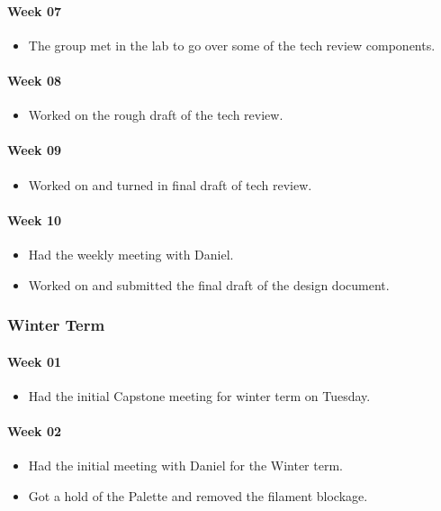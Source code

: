 \paragraph{Week 07}
\begin{itemize}
\item The group met in the lab to go over some of the tech review components. 
\end{itemize}
\paragraph{Week 08}
\begin{itemize}
\item Worked on the rough draft of the tech review. 
\end{itemize}
\paragraph{Week 09}
\begin{itemize}
\item Worked on and turned in final draft of tech review. 
\end{itemize}
\paragraph{Week 10}
\begin{itemize}
\item Had the weekly meeting with Daniel.
\item Worked on and submitted the final draft of the design document. 
\end{itemize}

\subsubsection{Winter Term}
\paragraph{Week 01}
\begin{itemize}
\item Had the initial Capstone meeting for winter term on Tuesday. 
\end{itemize}
\paragraph{Week 02}
\begin{itemize}
\item Had the initial meeting with Daniel for the Winter term. 
\item Got a hold of the Palette and removed the filament blockage. 
\end{itemize}
